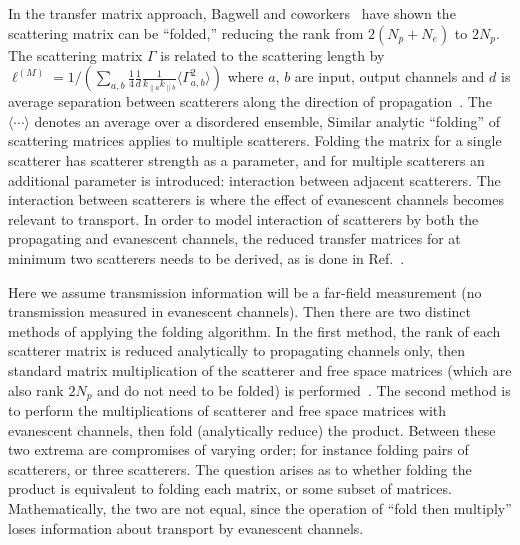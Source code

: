 In the transfer matrix approach, Bagwell and coworkers~\cite{1990_Bagwell,1991_Kumar_Bagwell} have shown the scattering matrix can be ``folded,'' reducing the rank from $2(N_p+N_e)$ to $2N_p$. The scattering matrix $\Gamma$ is related to the scattering length by 
$\ell^{(M)} = 1/\left(\sum_{a,b} \frac{1}{4} \frac{1}{d} \frac{1}{k_{\parallel a} k_{\parallel b}} \langle \Gamma_{a,b}^2 \rangle\right)$ where $a$, $b$ are input, output channels and $d$ is average separation between scatterers along the direction of propagation~\cite{2007_Froufe-Perez_PRE}. The $\langle \cdots \rangle$ denotes an average over a disordered ensemble,
Similar analytic ``folding'' of scattering matrices applies to multiple scatterers. Folding the matrix for a single scatterer has scatterer strength as a parameter, and for multiple scatterers an additional parameter is introduced: interaction between adjacent scatterers. The interaction between scatterers is where the effect of evanescent channels becomes relevant to transport. In order to model interaction of scatterers by both the propagating and evanescent channels, the reduced transfer matrices for at minimum two scatterers needs to be derived, as is done in Ref.~.



Here we assume transmission information will be a far-field measurement (no transmission measured in evanescent channels). Then there are two distinct methods of applying the folding algorithm. In the first method, the rank of each scatterer matrix is reduced analytically to propagating channels only, then standard matrix multiplication of the scatterer and free space matrices (which are also rank $2N_p$ and do not need to be folded) is performed~\cite{2004_Mello_Kumar_book}. The second method is to perform the multiplications of scatterer and free space matrices with evanescent channels, then fold (analytically reduce) the product. Between these two extrema are compromises of varying order; for instance folding pairs of scatterers, or three scatterers. The question arises  as to whether folding the product is equivalent to folding each matrix, or some subset of matrices. Mathematically, the two are not equal, since the operation of ``fold then multiply'' loses information about transport by evanescent channels. %

